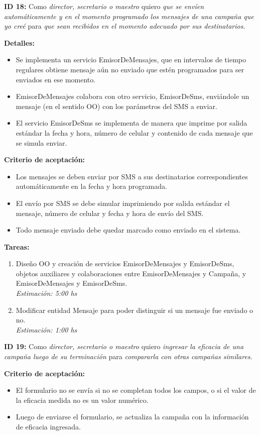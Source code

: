 \documentclass[a4paper, 10pt, twoside]{article}
\newcommand{\sprintstory}[4]{
  \noindent
  \textbf{ID #1:} Como \emph{#2} quiero \emph{#3} para \emph{#4}.
}
\newenvironment{detalles}{
  \textbf{Detalles:}
  \begin{itemize}
}{
  \end{itemize}
}
\newcommand{\detalle}[1] {
  \item #1.
}
\newenvironment{criterios}{
  \textbf{Criterio de aceptación:}
  \begin{itemize}
}{
  \end{itemize}
}
\newcommand{\criterio}[1] {
  \item #1
}
\newenvironment{tasks}{
  \textbf{Tareas:}
  \begin{enumerate}
}{
  \end{enumerate}
}
\newcommand{\task}[2] {
  \item #1.\\
  \emph{Estimación: #2 hs}
}
\begin{document}
\sprintstory{18}
            {director, secretario o maestro}
            {que se envíen automáticamente y en el momento programado los mensajes de una campaña que yo creé}
            {que sean recibidos en el momento adecuado por sus destinatarios}

\begin{detalles}
  \detalle{Se implementa un servicio EmisorDeMensajes, que en intervalos de tiempo regulares obtiene mensaje aún no enviado que estén programados para ser enviados en ese momento}
  \detalle{EmisorDeMensajes colabora con otro servicio, EmisorDeSms, enviándole un mensaje (en el sentido OO) con los parámetros del SMS a enviar}
  \detalle{El servicio EmisorDeSms se implementa de manera que imprime por salida estándar la fecha y hora, número de celular y contenido de cada mensaje que se simula enviar}
\end{detalles}

\begin{criterios}
  \criterio{Los mensajes se deben enviar por SMS a sus destinatarios correspondientes automáticamente en la fecha y hora programada.}
  \criterio{El envío por SMS se debe simular imprimiendo por salida estándar el mensaje, número de celular y fecha y hora de envío del SMS.}
  \criterio{Todo mensaje enviado debe quedar marcado como enviado en el sistema.}
\end{criterios}

\begin{tasks}
  \task{Diseño OO y creación de servicios EmisorDeMensajes y EmisorDeSms, objetos auxiliares y colaboraciones entre EmisorDeMensajes y Campaña, y EmisorDeMensajes y EmisorDeSms}{5:00}
  \task{Modificar entidad Mensaje para poder distinguir si un mensaje fue enviado o no}{1:00}
\end{tasks}


\sprintstory{19}
            {director, secretario o maestro}
            {ingresar la eficacia de una campaña luego de su terminación}
            {compararla con otras campañas similares}

\begin{criterios}
  \criterio{El formulario no se envía si no se completan todos los campos, o si el valor de la eficacia medida no es un valor numérico.}
  \criterio{Luego de enviarse el formulario, se actualiza la campaña con la información de eficacia ingresada.}
\end{criterios}
\end{document}
